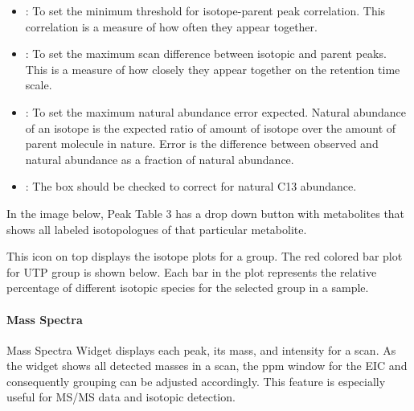 \documentclass[letterpaper,10pt,english,openany,oneside]{sphinxmanual}
\begin{document}
\begin{itemize}
\item {} 
: To set the minimum threshold for isotope-parent peak correlation. This correlation is a measure of how often they appear together.

\item {} 
: To set the maximum scan difference between isotopic and parent peaks. This is a measure of how closely they appear together on the retention time scale.

\item {} 
: To set the maximum natural abundance error expected. Natural abundance of an isotope is the expected ratio of amount of isotope over the amount of parent molecule in nature. Error is the difference between observed and natural abundance as a fraction of natural abundance.

\item {} 
: The box should be checked to correct for natural C13 abundance.

\end{itemize}

In the image below, Peak Table 3 has a drop down button with metabolites that shows all labeled isotopologues of that particular metabolite.





This icon  on top displays the isotope plots for a group. The red colored bar plot for UTP group is shown below. Each bar in the plot represents the relative percentage of different isotopic species for the selected group in a sample.



\paragraph{Mass Spectra}
\label{\detokenize{LabeledLCMSWorkflow:mass-spectra}}
Mass Spectra Widget  displays each peak, its mass, and intensity for a scan. As the widget shows all detected masses in a scan, the ppm window for the EIC and consequently grouping can be adjusted accordingly. This feature is especially useful for MS/MS data and isotopic detection.
\end{document}
